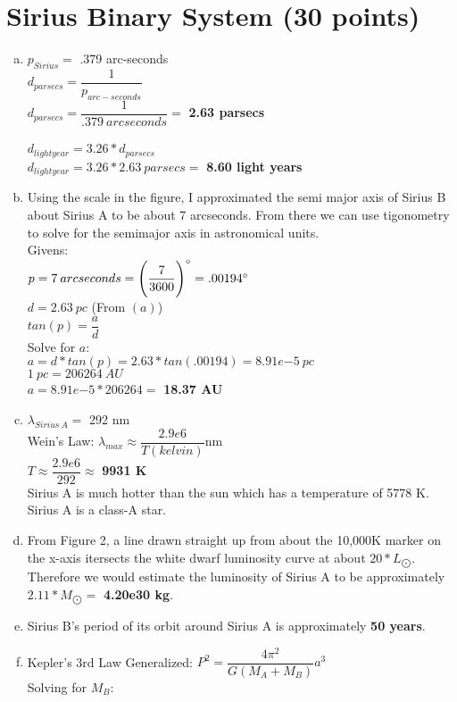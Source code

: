 \documentclass{article}
\begin{document}
\section{Sirius Binary System (30 points)}
    \begin{adjustwidth}{.6cm}{}
        \begin{enumerate}[a)]
            \item
            $p_{Sirius} = $ .379 arc-seconds\\
            $d_{parsecs} = \dfrac{1}{p_{arc-seconds}}$\\
            $d_{parsecs} = \dfrac{1}{.379\:arcseconds} = $ \textbf{2.63 parsecs}\\
            \\
            $d_{lightyear} = 3.26*d_{parsecs}$\\
            $d_{lightyear} = 3.26*2.63\:parsecs = $ \textbf{8.60 light years}
            \clearpage
            \item
            Using the scale in the figure, I approximated the semi major axis of Sirius B about Sirius A to be about 7 arcseconds. From there we can use tigonometry to solve for the semimajor axis in astronomical units.\\
            Givens:\\
            $p = 7\:arcseconds = \Bigg(\dfrac{7}{3600}\Bigg)\degree = .00194\degree$\\
            $d = 2.63\:pc$ (From $(a)$)\\
            $tan(p) = \dfrac{a}{d}$\\

            Solve for $a$:\\
            $a = d*tan(p) = 2.63*tan(.00194) = 8.91e{-5}\:pc$\\
            $1\:pc = 206264\:AU$\\
            $a = 8.91e{-5}*206264 =$ \textbf{18.37 AU}
            \item
            $\lambda_{Sirius\:A} = $ 292 nm\\
            Wein's Law: $\lambda_{max} \approx \dfrac{2.9e6}{T(kelvin)}$nm\\
            $T \approx \dfrac{2.9e6}{292} \approx $ \textbf{9931 K}\\
            Sirius A is much hotter than the sun which has a temperature of 5778 K.\\
            Sirius A is a class-A star.
            \item
            From Figure 2, a line drawn straight up from about the 10,000K marker on the x-axis itersects the white dwarf luminosity curve at about $20*L_{\bigodot}$. Therefore we would estimate the luminosity of Sirius A to be approximately $2.11*M_{\bigodot} = $ \textbf{4.20e30 kg}.
            \item
            Sirius B's period of its orbit around Sirius A is approximately \textbf{50 years}.
            \item
            Kepler's 3rd Law Generalized: $P^2 = \dfrac{4{\pi}^2}{G(M_A + M_B)}a^3$\\
            Solving for $M_B$:\\


\end{enumerate}
\end{adjustwidth}
\end{document}
